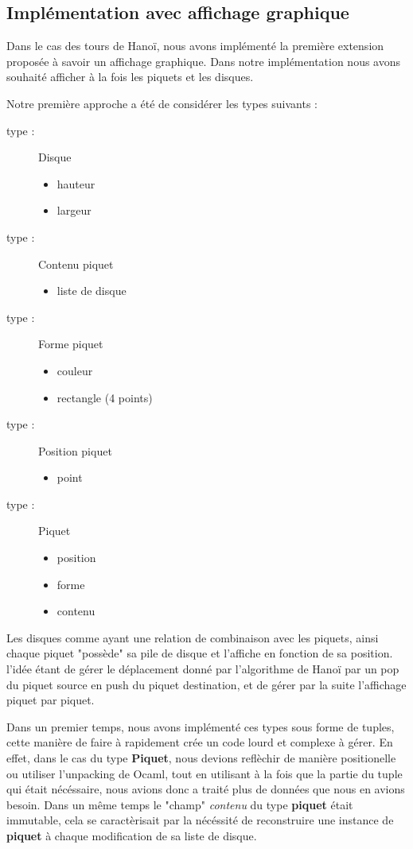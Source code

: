 \documentclass[a4paper,11pt]{article}
\begin{document}
\subsection{Implémentation avec affichage graphique}
Dans le cas des tours de Hanoï, nous avons implémenté la première extension proposée à savoir un affichage graphique.
Dans notre implémentation nous avons souhaité afficher à la fois les piquets et les disques.

Notre première approche a été de considérer les types suivants :
\begin{description}
\item[type :] Disque 
	\begin{itemize}
	\item hauteur
	\item largeur 
	\end{itemize}
\item[type :] Contenu piquet
	\begin{itemize}
	\item liste de disque
	\end{itemize}
\item[type :] Forme piquet
	\begin{itemize}
	\item couleur
	\item rectangle (4 points) 
	\end{itemize}
\item[type :]Position piquet
	\begin{itemize}
	\item point 
	\end{itemize}
\item [type :] Piquet 
	\begin{itemize}
	\item position
	\item forme
	\item contenu 
	\end{itemize}
\end{description}

Les disques comme ayant une relation de combinaison avec les piquets, ainsi chaque piquet "possède" sa pile de disque et l'affiche en fonction de sa position.
l'idée étant de gérer le déplacement donné par l'algorithme de Hanoï par un pop du piquet source en push du piquet destination, et de gérer par la suite l'affichage piquet par piquet. 

Dans un premier temps, nous avons implémenté ces types sous forme de tuples, cette manière de faire à rapidement crée un code lourd et complexe à gérer.
En effet, dans le cas du type \textbf{Piquet}, nous devions reflèchir de manière positionelle ou utiliser l'unpacking de Ocaml, tout en utilisant à la fois que la partie du tuple qui était nécéssaire, nous avions donc a traité plus de données que nous en avions besoin.
Dans un même temps le "champ" \textit{contenu} du type \textbf{piquet} était immutable,
cela se caractèrisait par la nécéssité de reconstruire une instance de \textbf{piquet} à chaque modification de sa liste de disque.
\end{document}
